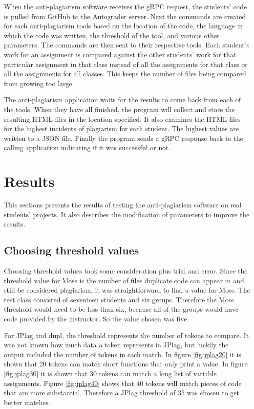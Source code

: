 \documentclass[10pt,journal,compsoc]{IEEEtran}
\begin{document}
		When the anti-plagiarism software receives the gRPC request, the students' code is pulled from GitHub to the Autograder server. Next the commands are created for each anti-plagiarism tools based on the location of the code, the language in which the code was written, the threshold of the tool, and various other parameters. The commands are then sent to their respective tools. Each student's work for an assignment is compared against the other students' work for that particular assignment in that class instead of all the assignments for that class or all the assignments for all classes. This keeps the number of files being compared from growing too large.
			
		The anti-plagiarism application waits for the results to come back from each of the tools. When they have all finished, the program will collect and store the resulting HTML files in the location specified. It also examines the HTML files for the highest incidents of plagiarism for each student. The highest values are written to a JSON file. Finally the program sends a gRPC response back to the calling application indicating if it was successful or not.
		
	\section{Results}
	This sections presents the results of testing the anti-plagiarism software on real students' projects. It also describes the modification of parameters to improve the results.
	
		\subsection{Choosing threshold values}
		Choosing threshold values took some consideration plus trial and error. Since the threshold value for Moss is the number of files duplicate code can appear in and still be considered plagiarism, it was straightforward to find a value for Moss. The test class consisted of seventeen students and six groups. Therefore the Moss threshold would need to be less than six, because all of the groups would have code provided by the instructor. So the value chosen was five.
		
		For JPlag and dupl, the threshold represents the number of tokens to compare. It was not known how much data a token represents in JPlag, but luckily the output included the number of tokens in each match. In figure \ref{fig:jplag20} it is shown that 20 tokens can match short functions that only print a value. In figure \ref{fig:jplag30} it is shown that 30 tokens can match a long list of variable assignments. Figure \ref{fig:jplag40} shows that 40 tokens will match pieces of code that are more substantial. Therefore a JPlag threshold of 35 was chosen to get better matches.
		
\end{document}
